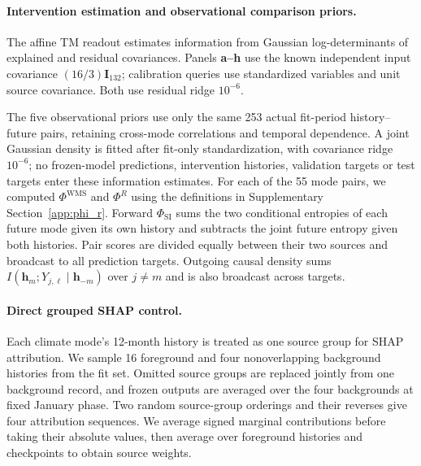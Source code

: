 \documentclass[fleqn,10pt]{wlscirep}
\newcommand{\rev}[1]{\textcolor{red}{#1}}
\begin{document}
\paragraph{Intervention estimation and observational comparison priors.}
The affine TM readout estimates information from Gaussian log-determinants of explained and residual covariances. Panels \textbf{a--h} use the known independent input covariance $(16/3)\mathbf{I}_{132}$; calibration queries use standardized variables and unit source covariance. Both use residual ridge $10^{-6}$.

The five observational priors use only the same 253 actual fit-period history--future pairs, retaining cross-mode correlations and temporal dependence. A joint Gaussian density is fitted after fit-only standardization, with covariance ridge $10^{-6}$; no frozen-model predictions, intervention histories, validation targets or test targets enter these information estimates. For each of the 55 mode pairs, we computed $\Phi^{\mathrm{WMS}}$ and $\Phi^R$ using the definitions in Supplementary Section~\ref{app:phi_r}. Forward $\Phi_{\mathrm{SI}}$ sums the two conditional entropies of each future mode given its own history and subtracts the joint future entropy given both histories. Pair scores are divided equally between their two sources and broadcast to all prediction targets. Outgoing causal density sums $I(\mathbf{h}_m;Y_{j,\ell}\mid\mathbf{h}_{-m})$ over $j\ne m$ and is also broadcast across targets.


\paragraph{Direct grouped SHAP control.}
Each climate mode's 12-month history is treated as one source group for SHAP attribution. We sample 16 foreground and four nonoverlapping background histories from the fit set. Omitted source groups are replaced jointly from one background record, and frozen outputs are averaged over the four backgrounds at fixed January phase. Two random source-group orderings and their reverses give four attribution sequences. We average signed marginal contributions before taking their absolute values, then average over foreground histories and checkpoints to obtain source weights.
\end{document}
